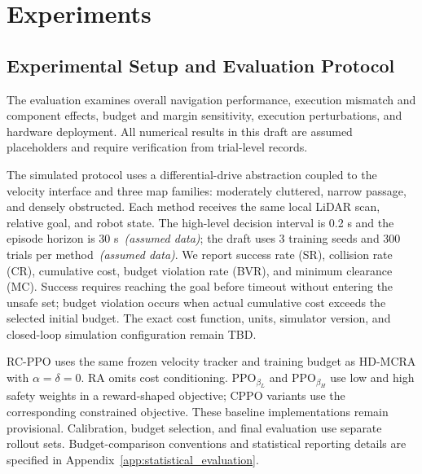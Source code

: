 \documentclass{article}
\begin{document}
\section{Experiments}
\subsection{Experimental Setup and Evaluation Protocol}
\label{sec:experimental_setup}
The evaluation examines overall navigation performance, execution mismatch and
component effects, budget and margin sensitivity, execution perturbations, and
hardware deployment. All numerical results in this draft are assumed placeholders
and require verification from trial-level records.

The simulated protocol uses a differential-drive abstraction coupled to the velocity
interface and three map families: moderately cluttered, narrow passage, and densely
obstructed. Each method receives the same local LiDAR scan, relative goal, and robot
state. The high-level decision interval is 0.2 s and the episode horizon is
30 s~\textit{(assumed data)}; the draft uses 3 training seeds and 300 trials per
method~\textit{(assumed data)}. We report success rate (SR), collision rate (CR),
cumulative cost, budget violation rate (BVR), and minimum clearance (MC). Success
requires reaching the goal before timeout without entering the unsafe set; budget
violation occurs when actual cumulative cost exceeds the selected initial budget.
The exact cost function, units, simulator version, and closed-loop simulation
configuration remain \textsc{TBD}.

RC-PPO uses the same frozen velocity tracker and training budget as HD-MCRA with
$\alpha=\delta=0$. RA omits cost conditioning. PPO$_{\beta_L}$ and
PPO$_{\beta_H}$ use low and high safety weights in a reward-shaped objective;
CPPO variants use the corresponding constrained objective. These baseline
implementations remain provisional. Calibration, budget selection, and final
evaluation use separate rollout sets. Budget-comparison conventions and statistical
reporting details are specified in Appendix~\ref{app:statistical_evaluation}.
\end{document}
